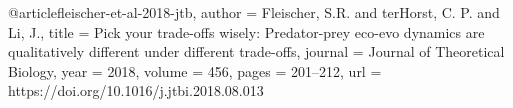 @article{fleischer-et-al-2018-jtb,
  author = {Fleischer, S.R. and terHorst, C. P. and Li, J.},
  title = {Pick your trade-offs wisely: Predator-prey eco-evo dynamics are qualitatively different under different trade-offs},
  journal = {Journal of Theoretical Biology},
  year = {2018},
  volume = {456},
  pages = {201--212},
  url = {https://doi.org/10.1016/j.jtbi.2018.08.013}
}